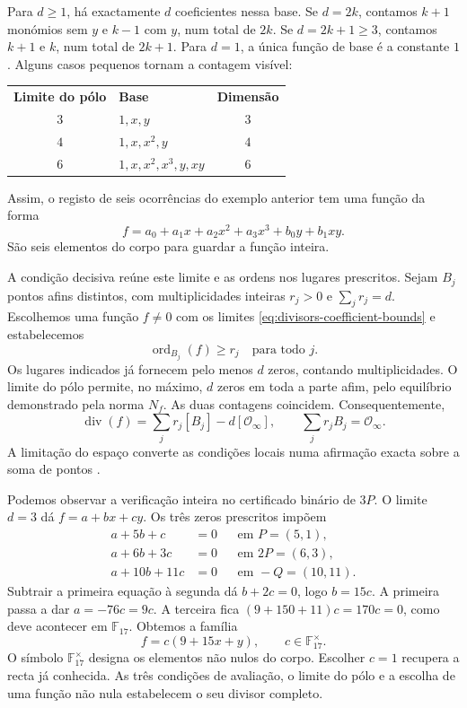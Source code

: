 Para \(d\geq1\), há exactamente \(d\) coeficientes nessa base.
Se \(d=2k\), contamos \(k+1\) monómios sem \(y\) e
\(k-1\) com \(y\), num total de \(2k\). Se
\(d=2k+1\geq3\), contamos \(k+1\) e \(k\), num total de
\(2k+1\). Para \(d=1\), a única função de base é a constante
\(1\). Alguns casos pequenos tornam a contagem visível:
\begin{center}
\begin{tabular}{c l c}
\textbf{Limite do pólo} & \textbf{Base} & \textbf{Dimensão}\\[1mm]
\(3\) & \(1,x,y\) & \(3\)\\
\(4\) & \(1,x,x^2,y\) & \(4\)\\
\(6\) & \(1,x,x^2,x^3,y,xy\) & \(6\)
\end{tabular}
\end{center}
Assim, o registo de seis ocorrências do exemplo anterior tem uma
função da forma
\[
 f=a_0+a_1x+a_2x^2+a_3x^3+b_0y+b_1xy.
\]
São seis elementos do corpo para guardar a função inteira.

A condição decisiva reúne este limite e as ordens nos lugares
prescritos. Sejam \(B_j\) pontos afins distintos, com
multiplicidades inteiras \(r_j>0\) e \(\sum_jr_j=d\).
Escolhemos uma função \(f\ne0\) com os limites
\eqref{eq:divisors-coefficient-bounds} e estabelecemos
\[
 \operatorname{ord}_{B_j}(f)\geq r_j\quad\text{para todo }j.
\]
Os lugares indicados já fornecem pelo menos \(d\) zeros,
contando multiplicidades. O limite do pólo permite, no máximo,
\(d\) zeros em toda a parte afim, pelo equilíbrio demonstrado
pela norma \(N_f\). As duas contagens
coincidem. Consequentemente,
\begin{equation}
 \operatorname{div}(f)=\sum_jr_j[B_j]-d[\mathcal O_\infty],
 \qquad \sum_jr_jB_j=\mathcal O_\infty.
 \label{eq:divisors-exact-certificate}
\end{equation}
A limitação do espaço converte as condições locais numa afirmação
exacta sobre a soma de pontos \cite{eagen-divisors}.

Podemos observar a verificação inteira no certificado binário de
\(3P\). O limite \(d=3\) dá \(f=a+bx+cy\). Os três zeros
prescritos impõem
\begin{align*}
 a+5b+c&=0&&\text{em }P=(5,1),\\
 a+6b+3c&=0&&\text{em }2P=(6,3),\\
 a+10b+11c&=0&&\text{em }-Q=(10,11).
\end{align*}
Subtrair a primeira equação à segunda dá \(b+2c=0\), logo
\(b=15c\). A primeira passa a dar
\(a=-76c=9c\). A terceira fica
\((9+150+11)c=170c=0\), como deve acontecer em
\(\mathbb F_{17}\). Obtemos a família
\[
 f=c(9+15x+y),\qquad c\in\mathbb F_{17}^{\times}.
\]
O símbolo \(\mathbb F_{17}^{\times}\) designa os elementos
não nulos do corpo. Escolher \(c=1\) recupera a recta já conhecida.
As três condições de avaliação, o limite do pólo e a escolha de uma
função não nula estabelecem o seu divisor completo.

